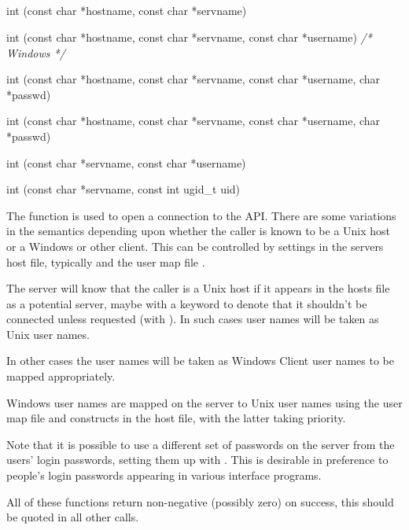 \subsection{\funcnameXBopen{}}

\begin{exparasmall}

int \funcnameXBopen{}(const char *hostname, const char *servname)

int \funcnameXBopen{}(const char *hostname, const char *servname, const char *username) \textit{/* Windows */}

int \funcnameXBlogin{}(const char *hostname, const char *servname, const char *username, char *passwd)

int \funcnameXBwlogin{}(const char *hostname, const char *servname, const char *username, char *passwd)

int \funcnameXBlocallogin(const char *servname, const char *username)

int \funcnameXBlocalloginbyid(const char *servname, const int ugid\_t uid)

\end{exparasmall}

The function \funcXBopen{} is used to open a connection to the \ProductName{} API.
There are some variations in the semantics depending upon whether the caller is known to be a Unix host or
a Windows or other client. This can be controlled by settings in the servers host file, typically
\hostsfile{} and the user map file \usermap.

The server will know that the caller is a Unix host if it appears in the hosts file as a potential server,
maybe with a  keyword to denote that it shouldn't be connected unless requested
(with \PrBtconn). In such cases user names will be taken as Unix user names.

In other cases the user names will be taken as Windows Client user names to be mapped appropriately.

Windows user names are mapped on the server to Unix user names using the user map file and constructs in the host file, with the latter taking priority.

Note that it is possible to use a different set of passwords on the server from the users' login passwords, setting them up with \PrXipasswd. This is desirable in preference to people's login passwords appearing in various interface programs.

All of these functions return non-negative (possibly zero) on success, this should be quoted in all other calls.

